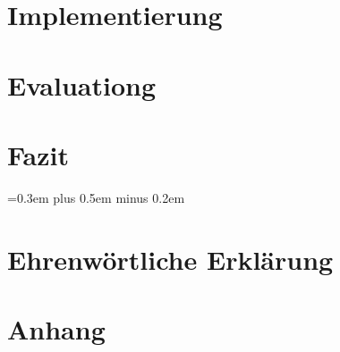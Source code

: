 \documentclass[
	12pt, %
	a4paper,
	bibliography=totoc, %
	numbers=noenddot, %
	ngerman, %
	headsepline, %
	oneside %
	]{scrbook} %
\begin{document}
\chapter{Implementierung}\label{ch:implementierung}


\chapter{Evaluationg}\label{ch:bewertung}


\chapter{Fazit}\label{ch:fazit}


\spaceskip=0.3em plus 0.5em minus 0.2em
\printbibliography


\chapter*{Ehrenwörtliche Erklärung}
\pagestyle{empty}


\appendix
\chapter*{Anhang}

\end{document}
